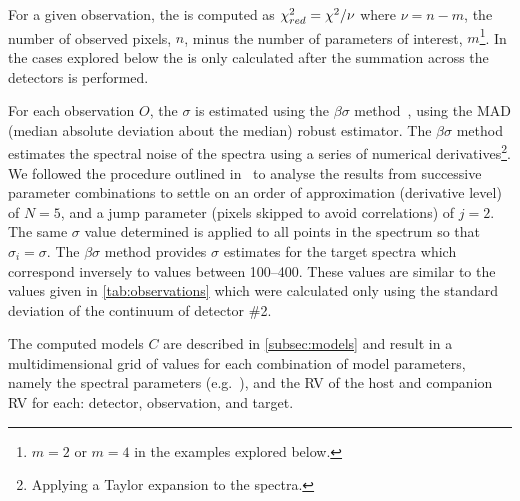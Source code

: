 For a given observation, the \textchisquaredreduced{} is computed as \({\chi}^{2}_{red}{}={\chi}^{2}{} / \nu\) where \(\nu = n - m\), the number of observed pixels, \(n\), minus the number of parameters of interest, \(m\)\footnote{\(m=2\) or \(m=4\) in the examples explored below.}.
In the cases explored below the \textchisquaredreduced{} is only calculated after the summation across the detectors is performed.


For each observation \(O\), the \(\sigma\) is estimated using the \(\beta\sigma\) method~\citep{czesla_posteriori_2018}, using the {MAD} (median absolute deviation about the median) robust estimator.
The \(\beta\sigma\) method estimates the spectral noise of the spectra using a series of numerical derivatives\footnote{Applying a Taylor expansion to the spectra.}.
We followed the procedure outlined in~\citet{czesla_posteriori_2018} to analyse the results from successive parameter combinations to settle on an order of approximation (derivative level) of \(N=5\), and a jump parameter (pixels skipped to avoid correlations) of \(j=2\).
The same \(\sigma\) value determined is applied to all points in the spectrum so that \({\sigma}_{i} = \sigma\).
The \(\beta\sigma\) method provides \(\sigma\) estimates for the target spectra which correspond inversely to \snr{} values between 100--400.
These \snr{} values are similar to the values given in \cref{tab:observations} which were calculated only using the standard deviation of the continuum of detector \#2.

The computed models \(C\) are described in \cref{subsec:models} and result in a multidimensional grid of \textchisquared{} values for each combination of model parameters, namely the spectral parameters  (e.g.\ \Teff{}), and the {RV} of the host and companion {RV} for each: detector, observation, and target.

